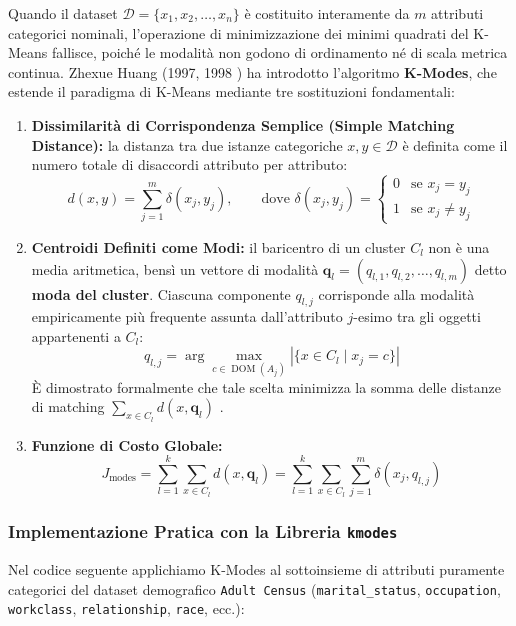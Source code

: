 Quando il dataset $\mathcal{D} = \{x_1, x_2, \dots, x_n\}$ è costituito interamente da $m$ attributi categorici nominali, l'operazione di minimizzazione dei minimi quadrati del K-Means fallisce, poiché le modalità non godono di ordinamento né di scala metrica continua. Zhexue Huang (1997, 1998 \cite{huang1998}) ha introdotto l'algoritmo \textbf{K-Modes}, che estende il paradigma di K-Means mediante tre sostituzioni fondamentali:
\begin{enumerate}
    \item \textbf{Dissimilarità di Corrispondenza Semplice (Simple Matching Distance):} la distanza tra due istanze categoriche $x, y \in \mathcal{D}$ è definita come il numero totale di disaccordi attributo per attributo:
    \begin{equation}
        d(x, y) = \sum_{j=1}^m \delta(x_j, y_j), \qquad \text{dove } \delta(x_j, y_j) = \begin{cases} 0 & \text{se } x_j = y_j \\ 1 & \text{se } x_j \ne y_j \end{cases}
    \end{equation}
    \item \textbf{Centroidi Definiti come Modi:} il baricentro di un cluster $C_l$ non è una media aritmetica, bensì un vettore di modalità $\mathbf{q}_l = (q_{l,1}, q_{l,2}, \dots, q_{l,m})$ detto \textbf{moda del cluster}. Ciascuna componente $q_{l,j}$ corrisponde alla modalità empiricamente più frequente assunta dall'attributo $j$-esimo tra gli oggetti appartenenti a $C_l$:
    \begin{equation}
        q_{l,j} = \arg\max_{c \in \operatorname{DOM}(A_j)} |\{ x \in C_l \mid x_j = c \}|
    \end{equation}
    È dimostrato formalmente che tale scelta minimizza la somma delle distanze di matching $\sum_{x \in C_l} d(x, \mathbf{q}_l)$ \cite{huang1998}.
    \item \textbf{Funzione di Costo Globale:}
    \begin{equation}
        J_{\text{modes}} = \sum_{l=1}^k \sum_{x \in C_l} d(x, \mathbf{q}_l) = \sum_{l=1}^k \sum_{x \in C_l} \sum_{j=1}^m \delta(x_j, q_{l,j})
    \end{equation}
\end{enumerate}

\subsubsection{Implementazione Pratica con la Libreria \texttt{kmodes}}
Nel codice seguente applichiamo K-Modes al sottoinsieme di attributi puramente categorici del dataset demografico \texttt{Adult Census} (\texttt{marital\_status}, \texttt{occupation}, \texttt{workclass}, \texttt{relationship}, \texttt{race}, ecc.):

